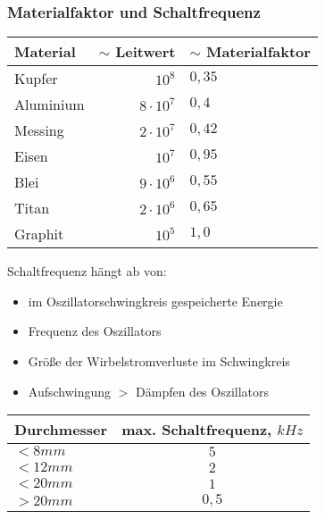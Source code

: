 \documentclass{scrreprt}
\begin{document}
\subsubsection{Materialfaktor und Schaltfrequenz}
\begin{tabular}{l | r l}
Material & $\sim $ Leitwert & $\sim $ Materialfaktor\\\hline
Kupfer & $10^8$ & $0,35$\\
Aluminium & $8\cdot 10^7$ & $0,4$\\
Messing & $2 \cdot 10^7$ & $0,42$\\
Eisen & $10^7$ & $0,95$\\
Blei & $9\cdot 10^6$ & $0,55$\\
Titan & $2 \cdot 10^6$ & $0,65$\\
Graphit & $10^5$ & $1,0$
\end{tabular}
Schaltfrequenz hängt ab von:
\begin{itemize}
\item im Oszillatorschwingkreis gespeicherte Energie
\item Frequenz des Oszillators
\item Größe der Wirbelstromverluste im Schwingkreis
\item Aufschwingung $>$ Dämpfen des Oszillators
\end{itemize}
\begin{tabular}{l | c}
Durchmesser & max. Schaltfrequenz, $\unit{kHz}$\\\hline
$<8 \unit{mm}$ & $5$\\
$<12 \unit{mm}$ & $2$\\
$<20\unit{mm}$ & $1$\\
$>20 \unit{mm}$ & $0,5$
\end{tabular}
\end{document}
